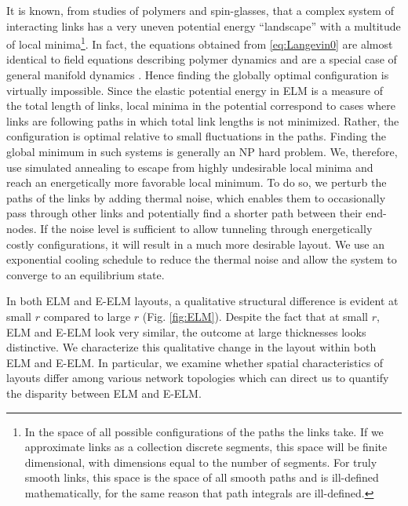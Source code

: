 \documentclass[nofootinbib,preprint,floatfix,endfloats]{revtex4} %
\begin{document}
It is known, from studies of polymers and spin-glasses, that a complex system of interacting links has a very uneven potential energy ``landscape'' \cite{parisi2002physical} with a multitude of local minima\footnote{In the space of all possible configurations of the paths the links take.
If we approximate links as a collection discrete segments, this space will be finite dimensional, with dimensions equal to the number of segments. 
For truly smooth links, this space is the space of all smooth paths and is ill-defined mathematically, for the same reason that path integrals are ill-defined.}.
In fact, 
the equations obtained from \eqref{eq:Langevin0} are almost identical to field equations describing polymer dynamics and are a special case of general manifold dynamics \cite{mezard1991replica}. 
Hence finding the globally optimal configuration is virtually impossible. 
Since the elastic potential energy in ELM is a measure of the total length of links, local minima in the potential correspond to cases where links are following paths in which total link lengths is not minimized. 
Rather, the configuration is optimal relative to small fluctuations in the paths. 
Finding the global minimum in such systems is generally an NP hard problem.
We, therefore, use simulated annealing \cite{hwang1988simulated} to escape from highly undesirable local minima and reach an energetically more favorable local minimum. 
To do so, we perturb the paths of the links by adding thermal noise, which enables them to occasionally pass through other links and potentially find a shorter path between their end-nodes.
If the noise level is sufficient to allow tunneling through energetically costly configurations, it will result in a much more desirable layout.
We use an exponential cooling schedule to reduce the thermal noise and allow the system to converge to an equilibrium state. 


In both ELM and E-ELM layouts, a qualitative structural difference is evident at small $r$ compared to large $r$ (Fig. \ref{fig:ELM}). Despite the fact that at small $r$, ELM and E-ELM look very similar, the outcome at large thicknesses looks distinctive. 
We characterize this qualitative change in the layout within both ELM and E-ELM. In particular, we examine whether spatial characteristics of layouts differ among various network topologies which can direct us to quantify the disparity between ELM and E-ELM. 
\end{document}
